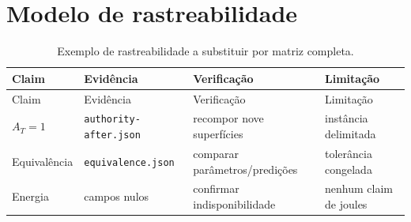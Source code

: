 \chapter{Modelo de rastreabilidade}
\label{app:rastreabilidade}

\begin{longtable}{@{}p{}p{}p{}p{}@{}}
\caption{Exemplo de rastreabilidade a substituir por matriz completa.}
\label{tab:trace}\\
\toprule
Claim & Evidência & Verificação & Limitação \\
\midrule
\endfirsthead
\toprule
Claim & Evidência & Verificação & Limitação \\
\midrule
\endhead
$A_T=1$ & {\scriptsize\texttt{authority-after.json}} & recompor nove superfícies & instância delimitada \\
Equivalência & {\scriptsize\texttt{equivalence.json}} & comparar parâmetros/predições & tolerância congelada \\
Energia & campos nulos & confirmar indisponibilidade & nenhum claim de joules \\
\bottomrule
\end{longtable}
